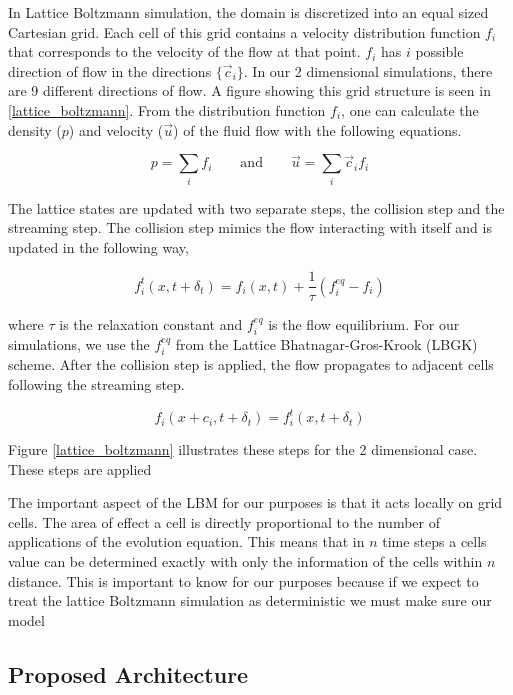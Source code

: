 \documentclass{article}
\begin{document}
In Lattice Boltzmann simulation, the domain is discretized into an equal sized Cartesian grid. Each cell of this grid contains a velocity distribution function $f_i$ that corresponds to the velocity of the flow at that point. $f_i$ has $i$ possible direction of flow in the directions $\{ \vec{c}_i \}$. In our 2 dimensional simulations, there are 9 different directions of flow. A figure showing this grid structure is seen in \ref{lattice_boltzmann}. From the distribution function $f_i$, one can calculate the density ($p$) and velocity ($\vec{u}$) of the fluid flow with the following equations.

\begin{equation}
  p = \sum_i f_i  \qquad\text{and}\qquad \vec{u} = \sum_i \vec{c}_i f_i 
\end{equation}

The lattice states are updated with two separate steps, the collision step and the streaming step. The collision step mimics the flow interacting with itself and is updated in the following way,

\begin{equation}
  f^t_i(x, t + \delta_t) = f_i(x,t) + \frac{1}{\tau} (f_i^{eq} - f_i)
\end{equation}

where $\tau$ is the relaxation constant and $f_i^{eq}$ is the flow equilibrium. For our simulations, we use the $f_i^{eq}$ from the Lattice Bhatnagar-Gros-Krook (LBGK) scheme. After the collision step is applied, the flow propagates to adjacent cells following the streaming step. 

\begin{equation}
  f_i(x + c_i, t + \delta_t) = f^t_i(x,t + \delta_t)
\end{equation}

Figure \ref{lattice_boltzmann} illustrates these steps for the 2 dimensional case. These steps are applied 

The important aspect of the LBM for our purposes is that it acts locally on grid cells. The area of effect a cell is directly proportional to the number of applications of the evolution equation. This means that in $n$ time steps a cells value can be determined exactly with only the information of the cells within $n$ distance. This is important to know for our purposes because if we expect to treat the lattice Boltzmann simulation as deterministic we must make sure our model 

\subsection{Proposed Architecture}
\end{document}
